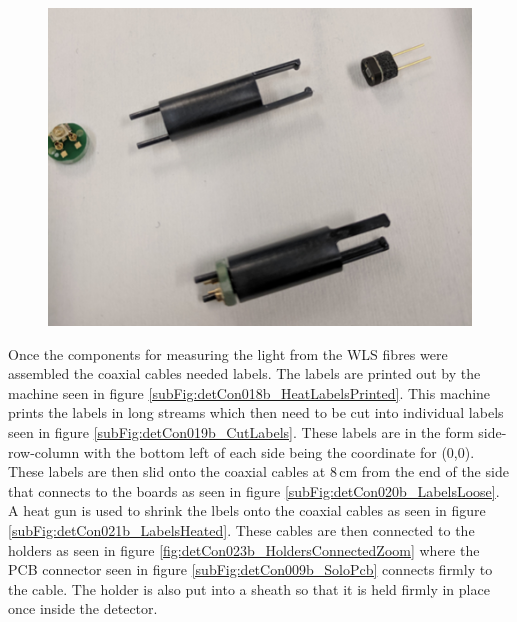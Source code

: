 \begin{figure}[htbp]
\centering
\includegraphics[width=0.8\linewidth]{Chapter3/Figs/Raster/detCon017b_HoldersWithParts.png}
\label{fig:detCon017b_HoldersWithParts}
\end{figure}

Once the components for measuring the light from the WLS fibres were assembled the coaxial cables needed labels. The labels are printed out by the machine seen in figure  \ref{subFig:detCon018b_HeatLabelsPrinted}. This machine prints the labels in long streams which then need to be cut into individual labels seen in figure \ref{subFig:detCon019b_CutLabels}. These labels are in the form side-row-column with the bottom left of each side being the coordinate for (0,0). These labels are then slid onto the coaxial cables at 8\,cm from the end of the side that connects to the boards as seen in figure \ref{subFig:detCon020b_LabelsLoose}. A heat gun is used to shrink the lbels onto the coaxial cables as seen in figure \ref{subFig:detCon021b_LabelsHeated}. These cables are then connected to the holders as seen in figure \ref{fig:detCon023b_HoldersConnectedZoom} where the PCB connector seen in figure \ref{subFig:detCon009b_SoloPcb} connects firmly to the cable. The holder is also put into a sheath so that it is held firmly in place once inside the detector.

